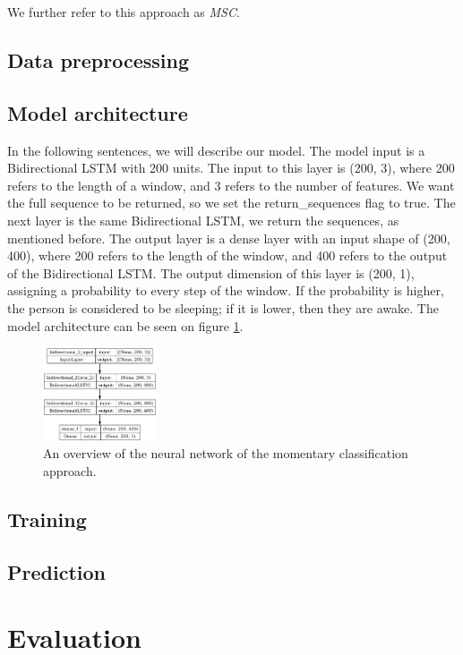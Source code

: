\documentclass{article}
\begin{document}
We further refer to this approach as \textit{MSC}.

\subsection{Data preprocessing}

\subsection{Model architecture}
In the following sentences, we will describe our model. The model input is a Bidirectional LSTM with 200 units. The input to this layer is (200, 3), where 200 refers to the length of a window, and 3 refers to the number of features. We want the full sequence to be returned, so we set the return\_sequences flag to true. The next layer is the same Bidirectional LSTM, we return the sequences, as mentioned before. The output layer is a dense layer with an input shape of (200, 400), where 200 refers to the length of the window, and 400 refers to the output of the Bidirectional LSTM. The output dimension of this layer is (200, 1), assigning a probability to every step of the window. If the probability is higher, the person is considered to be sleeping; if it is lower, then they are awake. The model architecture can be seen on figure \ref{fig:model-lstm}.

\begin{figure}
    \label{fig:model-lstm}
    \centering
    \includegraphics[width=0.3\textwidth]{model_plot-2.png}
    \caption{An overview of the neural network of the momentary classification approach.}
\end{figure}

\subsection{Training}

\subsection{Prediction}

\section{Evaluation}
\end{document}
